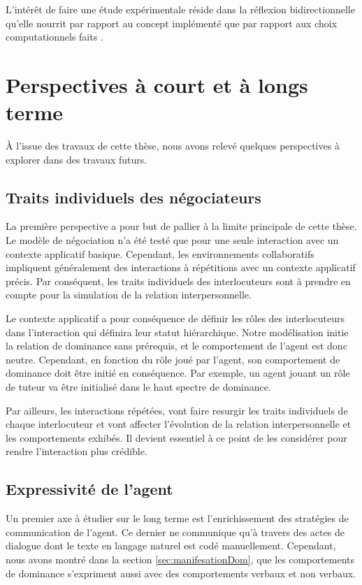 L'intérêt de faire une étude expérimentale réside dans la réflexion bidirectionnelle qu’elle nourrit par rapport au concept implémenté que par rapport aux choix computationnels faits \cite{faur2016approche}.

\section{Perspectives à court et à longs terme}

À l’issue des travaux de cette thèse, nous avons relevé quelques perspectives à explorer dans des travaux futurs.

\subsection{Traits individuels des négociateurs}

La première perspective a pour but de pallier à la limite principale de cette thèse. Le modèle de négociation n'a été testé que pour une seule interaction avec un contexte applicatif basique. Cependant, les environnements collaboratifs impliquent généralement des interactions à répétitions avec un contexte applicatif précis. Par conséquent, les traits individuels des interlocuteurs sont à prendre en compte pour la simulation de la relation interpersonnelle. 

Le contexte applicatif a pour conséquence de définir les rôles des interlocuteurs dans l'interaction qui définira leur statut hiérarchique. Notre modélisation initie la relation de dominance sans prérequis, et le comportement de l'agent est donc neutre. Cependant, en fonction du rôle joué par l'agent, son comportement de dominance doit être initié en conséquence. Par exemple, un agent jouant un rôle de tuteur va être initialisé dans le haut spectre de dominance. 

Par ailleurs, les interactions répétées, vont faire resurgir les traits individuels de chaque interlocuteur et vont affecter l'évolution de la relation interpersonnelle et les comportements exhibés. Il devient essentiel à ce point de les considérer pour rendre l'interaction plus crédible.

\subsection{Expressivité de l'agent}

Un premier axe à étudier sur le long terme est l'enrichissement des stratégies de communication de l'agent. Ce dernier ne communique qu'à travers des actes de dialogue dont le texte en langage naturel est codé manuellement. Cependant, nous avons montré dans la section \ref{sec:manifesationDom}, que les comportements de dominance s'expriment aussi avec des comportements verbaux et non verbaux.

